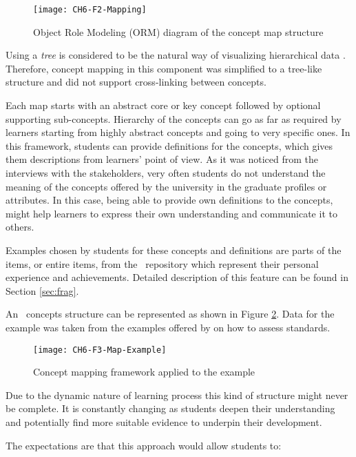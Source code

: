 \begin{figure}[htb]
\centering
\texttt{[image: CH6-F2-Mapping]}
\caption{Object Role Modeling (ORM) diagram of the concept map structure}
\label{fig:mapping} 
\end{figure}

Using a \textit{tree} is considered to be the natural way of visualizing
hierarchical data \citep{Gorg2007}. Therefore, concept mapping in this component
was simplified to a tree-like structure and did not support cross-linking
between concepts.

Each map starts with an abstract core or key concept followed by optional
supporting sub-concepts. Hierarchy of the concepts can go as far as required by
learners starting from highly abstract concepts and going to very specific ones.
In this framework, students can provide definitions for the concepts, which
gives them descriptions from learners' point of view. As it was noticed from the
interviews with the stakeholders, very often students do not understand the
meaning of the concepts offered by the university in the graduate profiles or
attributes. In this case, being able to provide own definitions to the concepts,
might help learners to express their own understanding and communicate it to
others.

Examples chosen by students for these concepts and definitions are parts of the
items, or entire items, from the \ep~repository which represent their personal
experience and achievements. Detailed description of this feature can be found
in Section \ref{sec:frag}.

An \ep~concepts structure can be represented as shown in Figure \ref{fig:mapex}.
Data for the example was taken from the examples offered by \citet{Marzano1993}
on how to assess \LLLs standards.
 
\begin{figure}[htb]
\centering
\texttt{[image: CH6-F3-Map-Example]}
\caption{Concept mapping framework applied to the example}
\label{fig:mapex} 
\end{figure}

Due to the dynamic nature of learning process this kind of structure might never
be complete. It is constantly changing as students deepen their understanding
and potentially find more suitable evidence to underpin their development.

The expectations are that this approach would allow students to:

